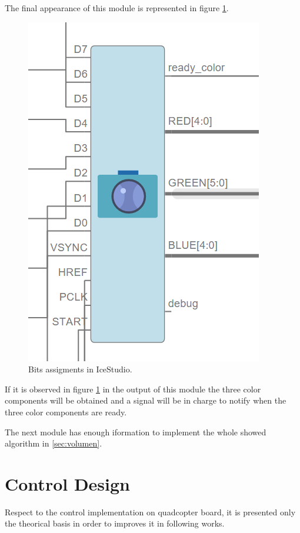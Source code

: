 	The final appearance of this module is represented in figure \ref{fig:assign_bits}.
	
		\begin{figure}[H]
		\center
		\includegraphics[scale=0.6, angle=0]{imagenes/Cuadricoptero_vision/assign_bits}
		\caption{Bits assigments in IceStudio.}
		\label{fig:assign_bits}
	\end{figure}
	
 
 	 If it is observed in figure \ref{fig:assign_bits} in the output of this module the three color components will be obtained and a signal will be in charge to notify when the three color components are ready.\newline
	
	The next module has enough iformation to implement the whole showed algorithm in \ref{sec:volumen}.

\section{Control Design}

Respect to the control implementation on quadcopter board, it is presented only the theorical basis in order to improves it in following works. 

